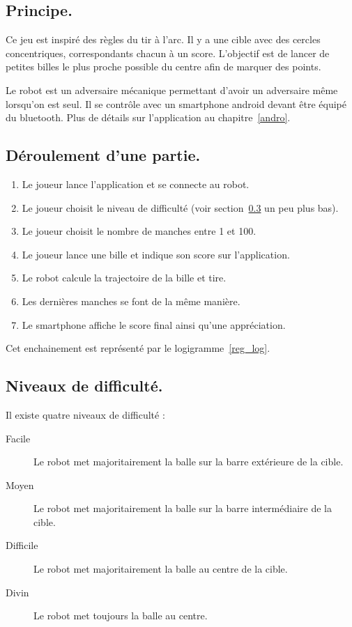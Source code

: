 \subsection{Principe.}

Ce jeu est inspiré des règles du tir à l'arc. Il y a une cible avec des cercles concentriques, correspondants chacun à un score. L'objectif est de lancer de petites billes le plus proche possible du centre afin de marquer des points.

Le robot est un adversaire mécanique permettant d'avoir un adversaire même lorsqu'on est seul. Il se contrôle avec un smartphone android devant être équipé du bluetooth. Plus de détails sur l'application au chapitre~\ref{andro}.

\subsection{Déroulement d'une partie.}
\begin{enumerate}
	\item Le joueur lance l'application et se connecte au robot.
	\item Le joueur choisit le niveau de difficulté (voir section~\ref{reg_dif} un peu plus bas).
	\item Le joueur choisit le nombre de manches entre 1 et 100.
	\item Le joueur lance une bille et indique son score sur l'application.
	\item Le robot calcule la trajectoire de la bille et tire.
	\item Les dernières manches se font de la même manière.
	\item Le smartphone affiche le score final ainsi qu'une appréciation.
\end{enumerate}

Cet enchainement est représenté par le logigramme~\ref{reg_log}.

\subsection{Niveaux de difficulté.} \label{reg_dif}
Il existe quatre niveaux de difficulté : \begin{description}
	\item[Facile] Le robot met majoritairement la balle sur la barre extérieure de la cible.
	\item[Moyen] Le robot met majoritairement la balle sur la barre intermédiaire de la cible.
	\item[Difficile] Le robot met majoritairement la balle au centre de la cible.
	\item[Divin] Le robot met toujours la balle au centre.
\end{description}

